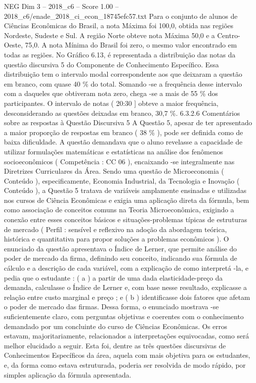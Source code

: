 \begin{textsample}{NEG Dim 3 – 2018\_c6 – Score 1.00 – 2018\_c6/enade\_2018\_ci\_econ\_18745efc57.txt}
Para o conjunto de alunos de Ciências Econômicas do Brasil, a nota Máxima foi 100,0, obtida nas regiões Nordeste, Sudeste e Sul.
A região Norte obteve nota Máxima 50,0 e a Centro-Oeste, 75,0.
A nota Mínima do Brasil foi zero, o mesmo valor encontrado em todas as regiões.
No Gráfico 6.13, é representada a distribuição das notas da questão discursiva 5 do Componente de Conhecimento Específico.
Essa distribuição tem o intervalo modal correspondente aos que deixaram a questão em branco, com quase 40 \% do total.
Somando -se a frequência desse intervalo com a daqueles que obtiveram nota zero, chega -se a mais de 55 \% dos participantes.
O intervalo de notas ( 20:30 ] obteve a maior frequência, desconsiderando as questões deixadas em branco, 30,7 \%. 6.3.2.6 Comentários sobre as respostas à Questão Discursiva 5 A Questão 5, apesar de ter apresentado a maior proporção de respostas em branco ( 38 \% ), pode ser definida como de baixa dificuldade.
A questão demandava que o aluno revelasse a capacidade de utilizar formulações matemáticas e estatísticas na análise dos fenômenos socioeconômicos ( Competência : CC 06 ), encaixando -se integralmente nas Diretrizes Curriculares da Área.
Sendo uma questão de Microeconomia ( Conteúdo ), especificamente, Economia Industrial, da Tecnologia e Inovação ( Conteúdo ), a Questão 5 tratava de variáveis amplamente ensinadas e utilizadas nos cursos de Ciência Econômicas e exigia uma aplicação direta da fórmula, bem como associação de conceitos comuns na Teoria Microeconômica, exigindo a conexão entre esses conceitos básicos e situações-problemas típicas de estruturas de mercado ( Perfil : sensível e reflexivo na adoção da abordagem teórica, histórica e quantitativa para propor soluções a problemas econômicos ).
O enunciado da questão apresentava o Índice de Lerner, que permite análise do poder de mercado da firma, definindo seu conceito, indicando sua fórmula de cálculo e a descrição de cada variável, com a explicação de como interpretá -la, e pedia que o estudante : ( a ) a partir de uma dada elasticidade-preço da demanda, calculasse o Índice de Lerner e, com base nesse resultado, explicasse a relação entre custo marginal e preço ; e ( b ) identificasse dois fatores que afetam o poder de mercado das firmas.
Dessa forma, o enunciado mostrava -se suficientemente claro, com perguntas objetivas e coerentes com o conhecimento demandado por um concluinte do curso de Ciências Econômicas.
Os erros estavam, majoritariamente, relacionados a interpretações equivocadas, como será melhor elucidado a seguir.
Esta foi, dentre as três questões discursivas de Conhecimentos Específicos da área, aquela com mais objetiva para os estudantes, e, da forma como estava estruturada, poderia ser resolvida de modo rápido, por simples aplicação da fórmula apresentada.

\end{textsample}
